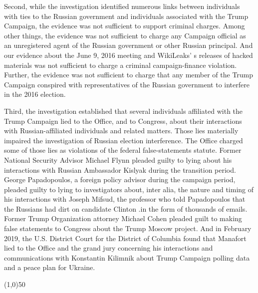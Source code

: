 \documentclass{article}
\newcommand{\hr}{\begin{center} \line(1,0){50} \end{center}}
\begin{document}

Second, while the investigation identified numerous links between individuals with ties to the Russian government and individuals associated with the Trump Campaign, the evidence was not sufficient to support criminal charges.
Among other things, the evidence was not sufficient to charge any Campaign official as an unregistered agent of the Russian government or other Russian principal.
And our evidence about the June 9, 2016 meeting and WikiLeaks' s releases of hacked materials was not sufficient to charge a criminal campaign-finance violation.
Further, the evidence was not sufficient to charge that any member of the Trump Campaign conspired with representatives of the Russian government to interfere in the 2016 election.

Third, the investigation established that several individuals affiliated with the Trump Campaign lied to the Office, and to Congress, about their interactions with Russian-affiliated individuals and related matters.
Those lies materially impaired the investigation of Russian election interference.
The Office charged some of those lies as violations of the federal false-statements statute.
Former National Security Advisor Michael Flynn pleaded guilty to lying about his interactions with Russian Ambassador Kislyak during the transition period.
George Papadopoulos, a foreign policy advisor during the campaign period, pleaded guilty to lying to investigators about, inter alia, the nature and timing of his interactions with Joseph Mifsud, the professor who told Papadopoulos that the Russians had dirt on candidate Clinton .in the form of thousands of emails.
Former Trump Organization attorney Michael Cohen pleaded guilt to making false statements to Congress about the Trump Moscow project.
And in February 2019, the U.S. District Court for the District of Columbia found that Manafort lied to the Office and the grand jury concerning his interactions and communications with Konstantin Kilimnik about Trump Campaign polling data and a peace plan for Ukraine.

\hr
\end{document}
